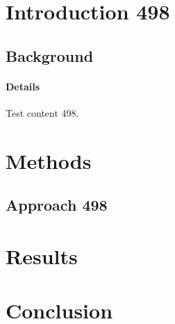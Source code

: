 \documentclass{article}
\begin{document}
\section{Introduction 498}
\subsection{Background}
\paragraph{Details} Test content 498.
\section{Methods}
\subsection{Approach 498}
\section{Results}
\section{Conclusion}
\end{document}
